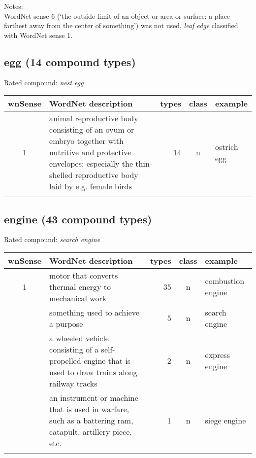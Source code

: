 \noindent
Notes:\\
WordNet sense 6 (`the outside limit of an object or area or surface; a place farthest away from the center of something') was not used, \emph{leaf edge} classified with WordNet sense 1.

\pagebreak[4]
\subsection{egg       (14 compound types)}
Rated compound: \emph{nest egg}

\vspace*{1ex}

\noindent
\begin{longtable}{c>{\raggedright\arraybackslash}p{5cm}rc>{\raggedright\arraybackslash}p{2cm}}\lsptoprule
{\small wnSense}&WordNet description&types&class&example\\\midrule
1&animal reproductive body consisting of an ovum or embryo together with nutritive and protective envelopes; especially the thin-shelled reproductive body laid by e.g. female birds&14&n&ostrich egg\\\lspbottomrule
\end{longtable}
\subsection{engine    (43 compound types)}
Rated compound: \emph{search engine}

\vspace*{1ex}

\noindent
\begin{longtable}{c>{\raggedright\arraybackslash}p{5cm}rc>{\raggedright\arraybackslash}p{2cm}}\lsptoprule
{\small wnSense}&WordNet description&types&class&example\\\midrule
1&motor that converts thermal energy to mechanical work&35&n&combustion engine\\\tablevspace
2&something used to achieve a purpose&5&n&search engine\\\tablevspace
3&a wheeled vehicle consisting of a self-propelled engine that is used to draw trains along railway tracks&2&n&express engine\\\tablevspace
4&an instrument or machine that is used in warfare, such as a battering ram, catapult, artillery piece, etc.&1&n&siege engine\\\lspbottomrule
\end{longtable}

